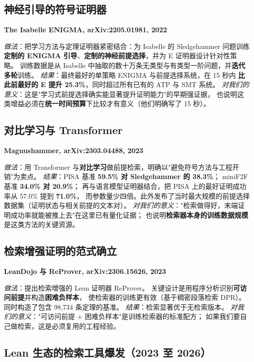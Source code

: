 \documentclass[UTF8,a4paper,11pt,fontset=windows]{ctexart}
\newcommand{\paper}[1]{\par\medskip\noindent\textbf{\color{sgblue!80!black}#1}\par\nobreak\vspace{1pt}}
\newcommand{\field}[1]{\textit{#1}：}
\begin{document}
\subsection{神经引导的符号证明器}

\paper{The Isabelle ENIGMA, arXiv:2205.01981, 2022}
\field{做法}把学习方法与定理证明器紧密结合：为 Isabelle 的 Sledgehammer 问题训练
\textbf{定制的 ENIGMA 引导}、\textbf{定制的神经前提选择}，并为 E 证明器设计针对性策略。
训练数据是从 Isabelle 中抽取的数十万条无类型与有类型一阶问题，并\textbf{迭代多轮}训练。
\field{结果}最终最好的单策略 ENIGMA 与前提选择系统，在 15 秒内
\textbf{比此前最好的 E 提升 25.3\%}，同时超过所有已有的 ATP 与 SMT 系统。
\field{对我们的意义}这是"学习式前提选择确实能显著提升证明能力"的早期强证据，
也说明这类增益必须在\textbf{统一时间预算}下比较才有意义（他们明确写了 15 秒）。

\subsection{对比学习与 Transformer}

\paper{Magnushammer, arXiv:2303.04488, 2023}
\field{做法}用 Transformer 与\textbf{对比学习}做前提检索，明确以"避免符号方法与工程开销"为卖点。
\field{结果}PISA 基准 \textbf{59.5\% 对 Sledgehammer 的 38.3\%}；
miniF2F 基准 \textbf{34.0\% 对 20.9\%}；
再与语言模型证明器结合，把 PISA 上的最好证明成功率从 57.0\% 提到 \textbf{71.0\%}，
而参数量少四倍。此外发布了当时最大规模的前提选择数据集（证明状态与相关前提的文本对）。
\field{对我们的意义}"检索做得好，末端证明成功率就能被推上去"在这里已有量化证据；
也说明\textbf{检索器本身的训练数据规模}是这类方法的关键资源。

\subsection{检索增强证明的范式确立}

\paper{LeanDojo 与 ReProver, arXiv:2306.15626, 2023}
\field{做法}提出检索增强的 Lean 证明器 ReProver。
关键设计是用程序分析识别\textbf{可访问前提}并构造\textbf{困难负样本}，
使检索器的训练更有效（基于稠密段落检索 DPR）。
同时构造了包含 98{,}734 条定理的基准。
\field{结果}检索显著优于无检索版本。
\field{对我们的意义}"可访问前提 + 困难负样本"是训练检索器的标准配方；
如果我们要自己做检索，这是必须复用的工程经验。

\subsection{Lean 生态的检索工具爆发（2023 至 2026）}
\end{document}
